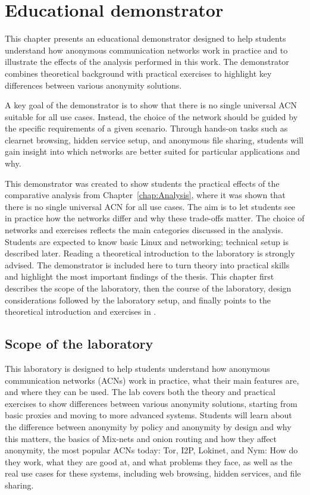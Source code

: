 \chapter{Educational demonstrator}
\label{chap:EducationalDemonstrator}
This chapter presents an educational demonstrator designed to help students understand how anonymous communication networks work in practice and to illustrate the effects of the analysis performed in this work. The demonstrator combines theoretical background with practical exercises to highlight key differences between various anonymity solutions.

A key goal of the demonstrator is to show that there is no single universal ACN suitable for all use cases. Instead, the choice of the network should be guided by the specific requirements of a given scenario. Through hands-on tasks such as clearnet browsing, hidden service setup, and anonymous file sharing, students will gain insight into which networks are better suited for particular applications and why.

This demonstrator was created to show students the practical effects of the comparative analysis from Chapter~\ref{chap:Analysis}, where it was shown that there is no single universal ACN for all use cases. The aim is to let students see in practice how the networks differ and why these trade-offs matter. The choice of networks and exercises reflects the main categories discussed in the analysis. Students are expected to know basic Linux and networking; technical setup is described later. Reading a theoretical introduction to the laboratory is strongly advised. The demonstrator is included here to turn theory into practical skills and highlight the most important findings of the thesis. This chapter first describes the scope of the laboratory, then the course of the laboratory, design considerations followed by the laboratory setup, and finally points to the theoretical introduction and exercises in .

\section{Scope of the laboratory}
This laboratory is designed to help students understand how anonymous communication networks (ACNs) work in practice, what their main features are, and where they can be used. The lab covers both the theory and practical exercises to show differences between various anonymity solutions, starting from basic proxies and moving to more advanced systems. Students will learn about the difference between anonymity by policy and anonymity by design and why this matters, the basics of Mix-nets and onion routing and how they affect anonymity, the most popular ACNs today: Tor, I2P, Lokinet, and Nym: How do they work, what they are good at, and what problems they face, as well as the real use cases for these systems, including web browsing, hidden services, and file sharing.


